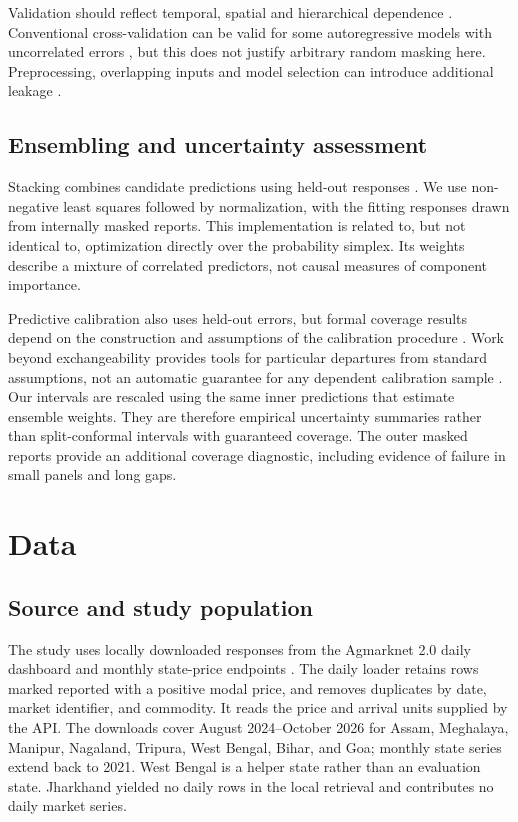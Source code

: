 \documentclass[sigconf,nonacm,balance=false]{acmart}
\begin{document}
Validation should reflect temporal, spatial and hierarchical dependence \cite{roberts2017}. Conventional cross-validation can be valid for some autoregressive models with uncorrelated errors \cite{bergmeir2018}, but this does not justify arbitrary random masking here. Preprocessing, overlapping inputs and model selection can introduce additional leakage \cite{kaufman2012,kapoor2023}.

\subsection{Ensembling and uncertainty assessment}

Stacking combines candidate predictions using held-out responses \cite{wolpert1992,breiman1996}. We use non-negative least squares followed by normalization, with the fitting responses drawn from internally masked reports. This implementation is related to, but not identical to, optimization directly over the probability simplex. Its weights describe a mixture of correlated predictors, not causal measures of component importance.

Predictive calibration also uses held-out errors, but formal coverage results depend on the construction and assumptions of the calibration procedure \cite{lei2018,gibbs2021}. Work beyond exchangeability provides tools for particular departures from standard assumptions, not an automatic guarantee for any dependent calibration sample \cite{barber2023}. Our intervals are rescaled using the same inner predictions that estimate ensemble weights. They are therefore empirical uncertainty summaries rather than split-conformal intervals with guaranteed coverage. The outer masked reports provide an additional coverage diagnostic, including evidence of failure in small panels and long gaps.

\section{Data}\label{sec:data}

\subsection{Source and study population}

The study uses locally downloaded responses from the Agmarknet 2.0 daily dashboard and monthly state-price endpoints \cite{agmarknet}. The daily loader retains rows marked reported with a positive modal price, and removes duplicates by date, market identifier, and commodity. It reads the price and arrival units supplied by the API. The downloads cover August 2024--October 2026 for Assam, Meghalaya, Manipur, Nagaland, Tripura, West Bengal, Bihar, and Goa; monthly state series extend back to 2021. West Bengal is a helper state rather than an evaluation state. Jharkhand yielded no daily rows in the local retrieval and contributes no daily market series.
\end{document}
